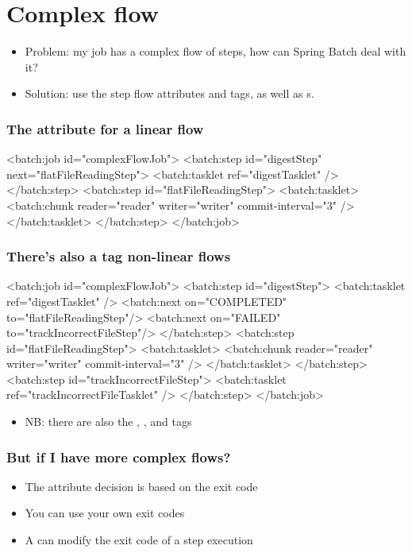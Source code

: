 \section{Complex flow}

\begin{frame}
 \begin{itemize}
  \item Problem: my job has a complex flow of steps, how can Spring Batch deal with it?
  \item Solution: use the step flow attributes and tags, as well as s.
 \end{itemize}
\end{frame}

\begin{frame}[fragile]
 \frametitle{The  attribute for a linear flow}
\begin{xmlcode}
<batch:job id="complexFlowJob">
  <batch:step id="digestStep" next="flatFileReadingStep">
    <batch:tasklet ref="digestTasklet" />
  </batch:step>		
  <batch:step id="flatFileReadingStep">
    <batch:tasklet>
      <batch:chunk reader="reader" writer="writer" 
                   commit-interval="3" />
    </batch:tasklet>		
  </batch:step>	
</batch:job>
\end{xmlcode}
\end{frame}

\begin{frame}[fragile]
 \frametitle{There's also a  tag non-linear flows}
\begin{xmlcode}
<batch:job id="complexFlowJob">
  <batch:step id="digestStep">
    <batch:tasklet ref="digestTasklet" />
    <batch:next on="COMPLETED" to="flatFileReadingStep"/>
    <batch:next on="FAILED" to="trackIncorrectFileStep"/>
  </batch:step>
  <batch:step id="flatFileReadingStep">
    <batch:tasklet>
      <batch:chunk reader="reader" writer="writer" 
                   commit-interval="3" />
    </batch:tasklet>
  </batch:step>
  <batch:step id="trackIncorrectFileStep">
    <batch:tasklet ref="trackIncorrectFileTasklet" />
  </batch:step>
</batch:job>
\end{xmlcode}
\begin{itemize}
 \item NB: there are also the , , and  tags
\end{itemize}

\end{frame}

\begin{frame}
 \frametitle{But if I have more complex flows?}
 \begin{itemize}
  \item The  attribute decision is based on the exit code
  \item You can use your own exit codes
  \item A  can modify the exit code of a step execution
 \end{itemize}

\end{frame}

